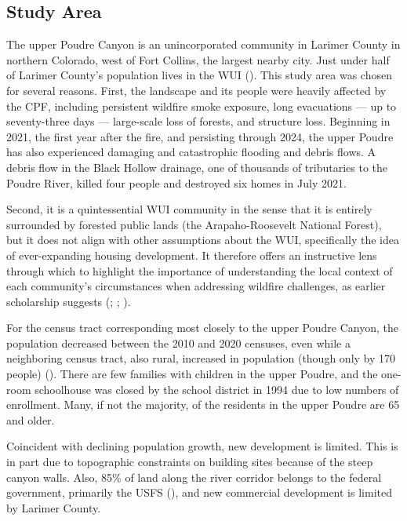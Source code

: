 \documentclass[
]{article}
\begin{document}
\subsection{Study Area}\label{study-area}

The upper Poudre Canyon is an unincorporated community in Larimer County in northern Colorado, west of Fort Collins, the largest nearby city. Just under half of Larimer County's population lives in the WUI (). This study area was chosen for several reasons. First, the landscape and its people were heavily affected by the CPF, including persistent wildfire smoke exposure, long evacuations --- up to seventy-three days --- large-scale loss of forests, and structure loss. Beginning in 2021, the first year after the fire, and persisting through 2024, the upper Poudre has also experienced damaging and catastrophic flooding and debris flows. A debris flow in the Black Hollow drainage, one of thousands of tributaries to the Poudre River, killed four people and destroyed six homes in July 2021.

Second, it is a quintessential WUI community in the sense that it is entirely surrounded by forested public lands (the Arapaho-Roosevelt National Forest), but it does not align with other assumptions about the WUI, specifically the idea of ever-expanding housing development. It therefore offers an instructive lens through which to highlight the importance of understanding the local context of each community's circumstances when addressing wildfire challenges, as earlier scholarship suggests (; ; ).

For the census tract corresponding most closely to the upper Poudre Canyon, the population decreased between the 2010 and 2020 censuses, even while a neighboring census tract, also rural, increased in population (though only by 170 people) (). There are few families with children in the upper Poudre, and the one-room schoolhouse was closed by the school district in 1994 due to low numbers of enrollment. Many, if not the majority, of the residents in the upper Poudre are 65 and older.

Coincident with declining population growth, new development is limited. This is in part due to topographic constraints on building sites because of the steep canyon walls. Also, 85\% of land along the river corridor belongs to the federal government, primarily the USFS (), and new commercial development is limited by Larimer County.
\end{document}
